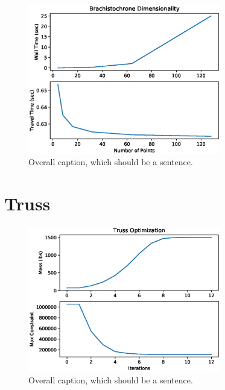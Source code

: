 \documentclass{article}
\begin{document}
\begin{figure}[htbp]
	\centering
	\includegraphics[width=0.75\textwidth]{figures/dimensionality.eps}
	\caption{Overall caption, which should be a sentence.}
	\label{fig:dimensionality}
\end{figure}


\section{Truss}

\begin{figure}[htbp]
	\centering
	\includegraphics[width=0.75\textwidth]{figures/truss.eps}
	\caption{Overall caption, which should be a sentence.}
	\label{fig:truss}
\end{figure}
\end{document}
